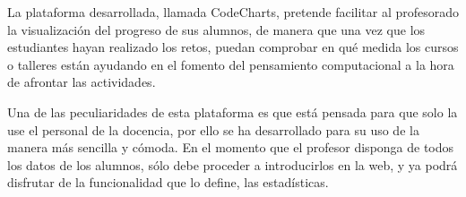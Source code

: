 

La plataforma desarrollada, llamada CodeCharts, pretende facilitar al profesorado la visualización del progreso de sus alumnos, de manera que una vez que los estudiantes hayan realizado los retos, puedan comprobar en qué medida los cursos
o talleres están ayudando en el fomento del pensamiento computacional a la hora de afrontar las actividades.

Una de las peculiaridades de esta plataforma es que está pensada para que solo la use el personal de la docencia, por ello se ha desarrollado para su uso de la manera más sencilla y cómoda. En el momento que el profesor disponga de todos los datos de los alumnos,
sólo debe proceder a introducirlos en la web, y ya podrá disfrutar de la funcionalidad que lo define, las estadísticas.





